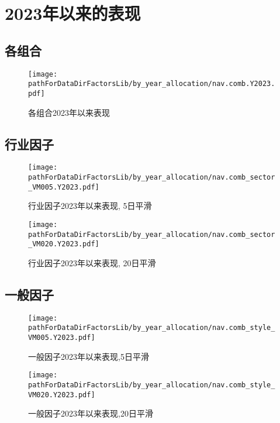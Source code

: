 \section{2023年以来的表现}

\subsection{各组合}
\begin{figure}[H]
    \centering
    \texttt{[image: \\pathForDataDirFactorsLib/by\_year\_allocation/nav.comb.Y2023.pdf]}
    \caption{各组合2023年以来表现}
    \label{fig_nav_since_2023}
\end{figure}

\subsection{行业因子}
\begin{figure}[H]
    \centering
    \texttt{[image: \\pathForDataDirFactorsLib/by\_year\_allocation/nav.comb\_sector\_VM005.Y2023.pdf]}
    \caption{行业因子2023年以来表现, 5日平滑}
    \label{fig_nav_sector_since_2023_VM005}
\end{figure}

\begin{figure}[H]
    \centering
    \texttt{[image: \\pathForDataDirFactorsLib/by\_year\_allocation/nav.comb\_sector\_VM020.Y2023.pdf]}
    \caption{行业因子2023年以来表现, 20日平滑}
    \label{fig_nav_sector_since_2023_VM020}
\end{figure}

\subsection{一般因子}
\begin{figure}[H]
    \centering
    \texttt{[image: \\pathForDataDirFactorsLib/by\_year\_allocation/nav.comb\_style\_VM005.Y2023.pdf]}
    \caption{一般因子2023年以来表现,5日平滑}
    \label{fig_nav_style_since_2023_VM005}
\end{figure}

\begin{figure}[H]
    \centering
    \texttt{[image: \\pathForDataDirFactorsLib/by\_year\_allocation/nav.comb\_style\_VM020.Y2023.pdf]}
    \caption{一般因子2023年以来表现,20日平滑}
    \label{fig_nav_style_since_2023_VM020}
\end{figure}

